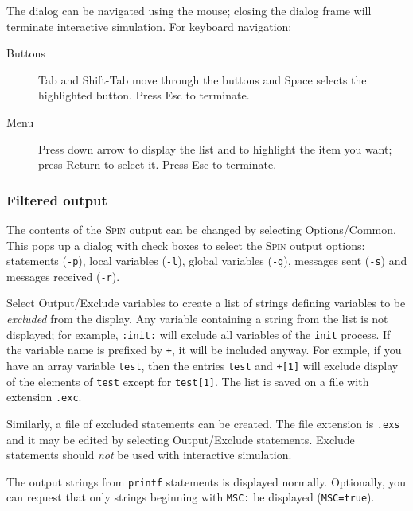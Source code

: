 \documentclass[11pt]{article}
\newcommand{\spn}{\textsc{Spin}}
\newcommand{\p}[1]{\texttt{#1}}
\newcommand{\bu}[1]{\textsf{#1}}
\begin{document}
The dialog can be navigated using the mouse; closing the dialog frame
will terminate interactive simulation. For keyboard navigation:
\begin{description}
\item[Buttons] \bu{Tab} and \bu{Shift-Tab} move through the buttons
and \bu{Space} selects the highlighted button. Press \bu{Esc} to terminate.
\item[Menu] Press down arrow to display the list and to highlight the
item you want; press \bu{Return} to select it. Press \bu{Esc} to terminate.
\end{description}

\subsubsection{Filtered output}\label{s.filter}
The contents of the \spn{} output can be changed by selecting 
\bu{Options/Common}. This pops up a dialog with check boxes to select the 
\spn{} output options: statements (\p{-p}), local variables (\p{-l}), 
global variables (\p{-g}), messages sent (\p{-s}) and messages received 
(\p{-r}). 

Select \bu{Output/Exclude variables} to create a list of strings defining 
variables to be \emph{excluded} from the display. Any variable containing 
a string from the list is not displayed; for example, \p{:init:} will 
exclude all variables of the \p{init} process. If the variable name is 
prefixed by \p{+}, it will be included anyway. For exmple, if you have an 
array variable \p{test}, then the entries \p{test} and \p{+[1]} will 
exclude display of the elements of \p{test} except for \p{test[1]}. The 
list is saved on a file with extension \p{.exc}.

Similarly, a file of excluded statements can be created. The file 
extension is \p{.exs} and it may be edited by selecting \bu{Output/Exclude 
statements}. \bu{Exclude statements} should \emph{not} be used with 
interactive simulation.

The output strings from \p{printf} statements is displayed normally. Optionally,
you can request that only strings beginning with \p{MSC:} be displayed (\p{MSC=true}).
\end{document}
